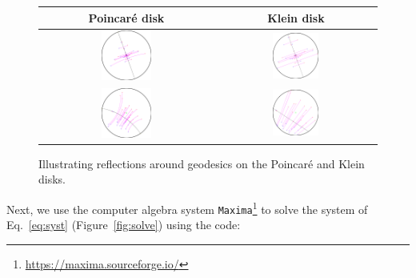 \documentclass{article}
\begin{document}
\begin{figure}
\centering
\begin{tabular}{cc}
Poincar\'e disk & Klein disk\\ \hline
\includegraphics[width=0.3\textwidth]{PoincareReflectionGeodesics-1.png} &
\includegraphics[width=0.3\textwidth]{KleinReflectionGeodesics-1.png} \\
\includegraphics[width=0.3\textwidth]{PoincareReflectionGeodesics-2.png} &
\includegraphics[width=0.3\textwidth]{KleinReflectionGeodesics-2.png} 
 \end{tabular}
\caption{Illustrating reflections around geodesics on the Poincar\'e and Klein disks.}\label{fig:illustration}
\end{figure}

Next, we use the computer algebra system {\tt Maxima}\footnote{\url{https://maxima.sourceforge.io/}} to solve the system of Eq.~\ref{eq:syst} (Figure~\ref{fig:solve}) using the code:
\end{document}
